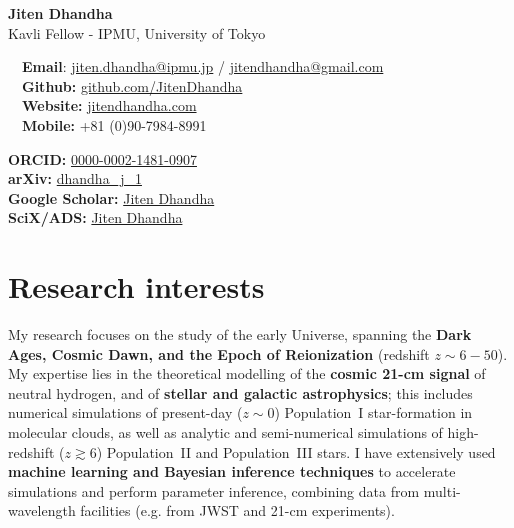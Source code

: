 \documentclass{article}
\begin{document}
\small %


\begin{center}
\huge
\textbf{Jiten Dhandha} \\
\normalsize
Kavli Fellow - IPMU, University of Tokyo \\
\end{center}

\begin{minipage}[ht]{0.6\linewidth}
	\faEnvelope~~\textbf{Email}: \href{mailto:jiten.dhandha@ipmu.jp}{jiten.dhandha@ipmu.jp} / \href{mailto:jitendhandha@gmail.com}{jitendhandha@gmail.com} \\
	\faGithub~~\textbf{Github:} \href{https://github.com/JitenDhandha}{github.com/JitenDhandha}\\
	\faGlobe~~\textbf{Website:} \href{https://jitendhandha.com}{jitendhandha.com} \\
  \faPhone~~\textbf{Mobile:} +81 (0)90-7984-8991 \\
\end{minipage}
\begin{minipage}[ht]{0.34\linewidth}
	\begin{flushright}
    \textbf{ORCID:} \href{https://orcid.org/0000-0002-1481-0907}{0000-0002-1481-0907} \\
    \textbf{arXiv:} \href{https://arxiv.org/a/dhandha_j_1.html}{dhandha\_j\_1} \\
    \textbf{Google Scholar:} \href{https://scholar.google.com/citations?user=RjlmcA0AAAAJ}{Jiten Dhandha} \\
    \textbf{SciX/ADS:} \href{https://scixplorer.org/user/libraries/-9hd8iXUQl6bWu8xYksd5A}{Jiten Dhandha} \\
	\end{flushright}
\end{minipage}

\section*{Research interests}

My research focuses on the study of the early Universe, spanning the \textbf{Dark Ages, Cosmic Dawn, and the Epoch of Reionization} (redshift $z\sim 6 - 50$). My expertise lies in the theoretical modelling of the \textbf{cosmic 21-cm signal} of neutral hydrogen, and of \textbf{stellar and galactic astrophysics}; this includes numerical simulations of present-day ($z \sim 0$) Population~I star-formation in molecular clouds, as well as analytic and semi-numerical simulations of high-redshift ($z \gtrsim 6$) Population~II and Population~III stars. I have extensively used \textbf{machine learning and Bayesian inference techniques} to accelerate simulations and perform parameter inference, combining data from multi-wavelength facilities (e.g. from JWST and 21-cm experiments).
\end{document}
